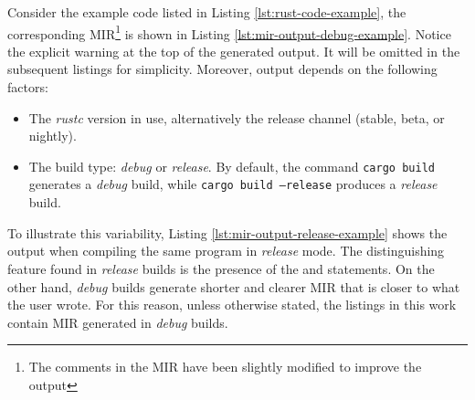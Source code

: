 Consider the example code listed in Listing \ref{lst:rust-code-example},
the corresponding \acrshort{MIR}\footnote{The comments in the MIR have been slightly modified to improve the output}
is shown in Listing \ref{lst:mir-output-debug-example}.
Notice the explicit warning at the top of the generated output.
It will be omitted in the subsequent listings for simplicity.
Moreover, output depends on the following factors:

\begin{itemize}
    \item The \emph{rustc} version in use,
          alternatively the release channel (stable, beta, or nightly).
    \item The build type: \emph{debug} or \emph{release}.
          By default, the command \texttt{cargo build} generates a \emph{debug} build,
          while \texttt{cargo build --release} produces a \emph{release} build.
\end{itemize}

To illustrate this variability, Listing \ref{lst:mir-output-release-example}
shows the output when compiling the same program in \emph{release} mode.
The distinguishing feature found in \emph{release} builds is
the presence of the  and  statements.
On the other hand, \emph{debug} builds generate
shorter and clearer \acrshort{MIR} that is closer to what the user wrote.
For this reason, unless otherwise stated,
the listings in this work contain \acrshort{MIR} generated in \emph{debug} builds.

